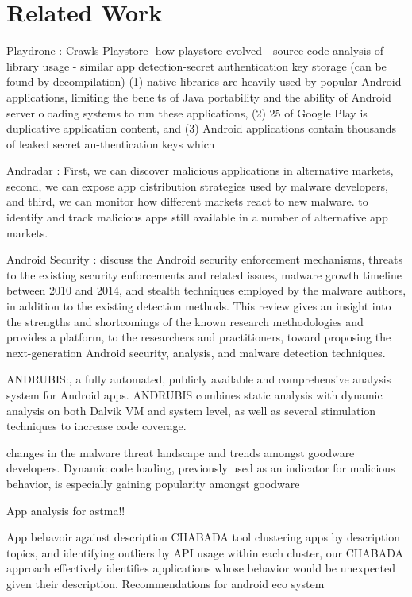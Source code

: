 \section{Related Work}
\label{RelatedWork}
Playdrone : Crawls Playstore- how playstore evolved - source code analysis of library usage - similar app detection-secret authentication key storage (can be found by decompilation)
(1) native libraries are heavily used by popular Android applications, limiting the benets of Java portability and the ability of Android server ooading systems to run these applications, (2) 25%
of Google Play is duplicative application content, and (3) Android applications contain thousands of leaked secret au-thentication keys which

Andradar : First, we can discover malicious applications in alternative markets, second, we can expose app distribution strategies used by malware developers, and third, we can monitor how different markets react to new malware. 
to identify and track malicious apps still available in a number of alternative app markets.

Android Security : discuss the Android security enforcement mechanisms,
threats to the existing security enforcements and related issues,
malware growth timeline between 2010 and 2014, and stealth
techniques employed by the malware authors, in addition to the
existing detection methods. This review gives an insight into the
strengths and shortcomings of the known research methodologies
and provides a platform, to the researchers and practitioners,
toward proposing the next-generation Android security, analysis,
and malware detection techniques.

ANDRUBIS:, a fully automated,
publicly available and comprehensive analysis system for
Android apps. ANDRUBIS combines static analysis with dynamic
analysis on both Dalvik VM and system level, as well as
several stimulation techniques to increase code coverage.

changes in the malware threat landscape
and trends amongst goodware developers. Dynamic code
loading, previously used as an indicator for malicious behavior,
is especially gaining popularity amongst goodware

App analysis for astma!!

App behavoir against description
CHABADA tool
clustering apps by description topics, and identifying outliers
by API usage within each cluster, our CHABADA approach effectively
identifies applications whose behavior would be unexpected
given their description.
Recommendations for android eco system


